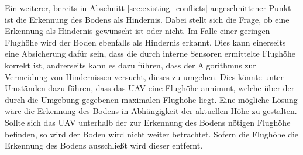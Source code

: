 \noindent
Ein weiterer, bereits in Abschnitt \ref{sec:existing_conflicts} angeschnittener Punkt ist die Erkennung des Bodens als Hindernis. Dabei stellt sich die Frage, ob eine Erkennung als Hindernis gewünscht ist oder nicht. Im Falle einer geringen Flughöhe wird der Boden ebenfalls als Hindernis erkannt. Dies kann einerseits eine Absicherung dafür sein, dass die durch interne Sensoren ermittelte Flughöhe korrekt ist, andrerseits kann es dazu führen, dass der Algorithmus zur Vermeidung von Hindernissen versucht, dieses zu  umgehen. Dies könnte unter Umständen dazu führen, dass das UAV eine Flughöhe annimmt, welche über der durch die Umgebung gegebenen maximalen Flughöhe liegt. Eine mögliche Lösung wäre die Erkennung des Bodens in Abhängigkeit der aktuellen Höhe zu gestalten. Sollte sich das UAV unterhalb der zur Erkennung des Bodens nötigen Flughöhe befinden, so wird der Boden wird nicht weiter betrachtet. Sofern die Flughöhe die Erkennung des Bodens ausschließt wird dieser entfernt.\\

